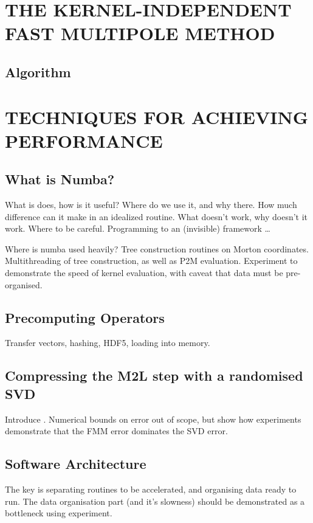 \documentclass{IEEEcsmag}
\begin{document}
\section{THE KERNEL-INDEPENDENT FAST MULTIPOLE METHOD}


\subsection{Algorithm}

\section{TECHNIQUES FOR ACHIEVING PERFORMANCE}

\subsection{What is Numba?}

What is does, how is it useful? Where do we use it, and why there. How much difference can it make in an idealized routine. What doesn't work, why doesn't it work. Where to be careful. Programming to an (invisible) framework \dots

Where is numba used heavily? Tree construction routines on Morton coordinates. Multithreading of tree construction, as well as P2M evaluation. Experiment to demonstrate the speed of kernel evaluation, with caveat that data must be pre-organised.

\subsection{Precomputing Operators}

Transfer vectors, hashing, HDF5, loading into memory.

\subsection{Compressing the M2L step with a randomised SVD}

Introduce \cite{Ying2004}. Numerical bounds on error out of scope, but show how experiments demonstrate that the FMM error dominates the SVD error.

\subsection{Software Architecture}

The key is separating routines to be accelerated, and organising data ready to run. The data organisation part (and it's slowness) should be demonstrated as a bottleneck using experiment.
\end{document}
